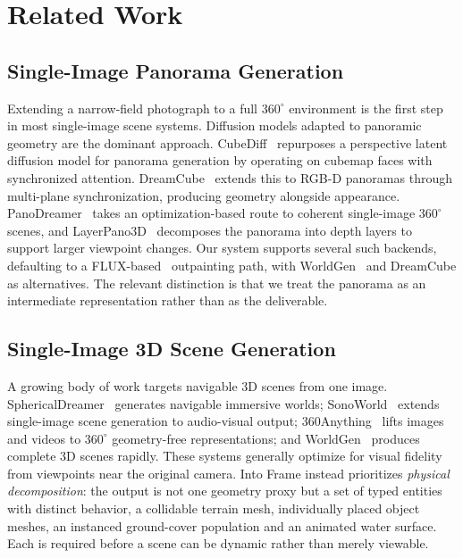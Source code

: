 \section{Related Work}
\label{sec:related}

\subsection{Single-Image Panorama Generation}

Extending a narrow-field photograph to a full $360^\circ$ environment is the
first step in most single-image scene systems. Diffusion models adapted to
panoramic geometry are the dominant approach.
CubeDiff~\cite{kalischek2025cubediffrepurposingdiffusionbasedimage} repurposes a
perspective latent diffusion model for panorama generation by operating on
cubemap faces with synchronized attention.
DreamCube~\cite{dreamcube,dreamcube_arxiv} extends this to RGB-D panoramas
through multi-plane synchronization, producing geometry alongside appearance.
PanoDreamer~\cite{paliwal2024panodreamer} takes an optimization-based route to
coherent single-image $360^\circ$ scenes, and
LayerPano3D~\cite{yang2024layerpano3d} decomposes the panorama into depth layers
to support larger viewpoint changes.
Our system supports several such backends, defaulting to a
FLUX-based~\cite{esser2024scalingrectifiedflowtransformers} outpainting path,
with WorldGen~\cite{worldgen2025ziyangxie} and DreamCube as alternatives. The
relevant distinction is that we treat the panorama as an intermediate
representation rather than as the deliverable.

\subsection{Single-Image 3D Scene Generation}

A growing body of work targets navigable 3D scenes from one image.
SphericalDreamer~\cite{schnepf2026sphericaldreamer} generates navigable immersive
worlds; SonoWorld~\cite{jin2026sonoworld} extends single-image scene generation to
audio-visual output; 360Anything~\cite{wu360anything} lifts images and videos
to $360^\circ$ geometry-free representations; and
WorldGen~\cite{worldgen2025ziyangxie} produces complete 3D scenes rapidly.
These systems generally optimize for visual fidelity from viewpoints near the
original camera. Into Frame instead prioritizes \emph{physical decomposition}: the
output is not one geometry proxy but a set of typed entities with distinct
behavior, a collidable terrain mesh, individually placed object meshes, an
instanced ground-cover population and an animated water surface. Each is required
before a scene can be dynamic rather than merely viewable.

